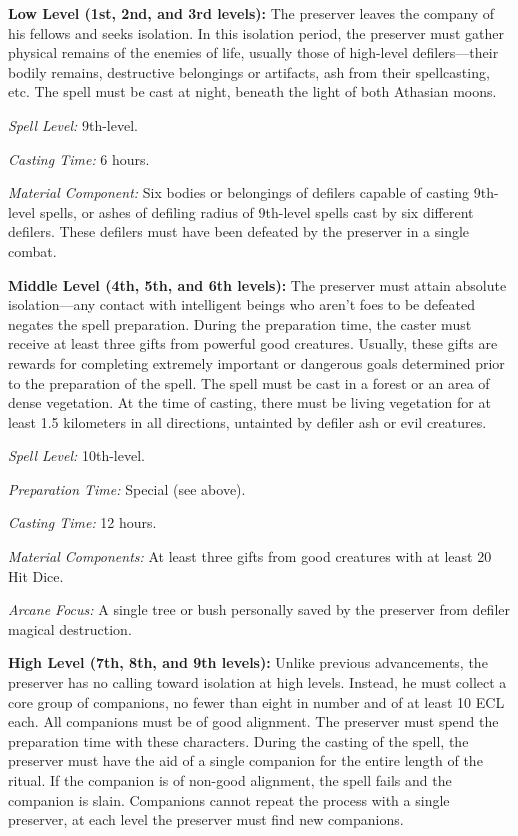 {\textbf{Low Level (1st, 2nd, and 3rd levels):} The preserver leaves the company of his fellows and seeks isolation. In this isolation period, the preserver must gather physical remains of the enemies of life, usually those of high-level defilers---their bodily remains, destructive belongings or artifacts, ash from their spellcasting, etc. The spell must be cast at night, beneath the light of both Athasian moons.

\textit{Spell Level:} 9th-level.

\textit{Casting Time:} 6 hours.

\textit{Material Component:} Six bodies or belongings of defilers capable of casting 9th-level spells, or ashes of defiling radius of 9th-level spells cast by six different defilers. These defilers must have been defeated by the preserver in a single combat.

\textbf{Middle Level (4th, 5th, and 6th levels):} The preserver must attain absolute isolation---any contact with intelligent beings who aren't foes to be defeated negates the spell preparation. During the preparation time, the caster must receive at least three gifts from powerful good creatures. Usually, these gifts are rewards for completing extremely important or dangerous goals determined prior to the preparation of the spell. The spell must be cast in a forest or an area of dense vegetation. At the time of casting, there must be living vegetation for at least 1.5 kilometers in all directions, untainted by defiler ash or evil creatures.

\textit{Spell Level:} 10th-level.

\textit{Preparation Time:} Special (see above).

\textit{Casting Time:} 12 hours.

\textit{Material Components:} At least three gifts from good creatures with at least 20 Hit Dice.

\textit{Arcane Focus:} A single tree or bush personally saved by the preserver from defiler magical destruction.

\textbf{High Level (7th, 8th, and 9th levels):} Unlike previous advancements, the preserver has no calling toward isolation at high levels. Instead, he must collect a core group of companions, no fewer than eight in number and of at least 10 ECL each. All companions must be of good alignment. The preserver must spend the preparation time with these characters. During the casting of the spell, the preserver must have the aid of a single companion for the entire length of the ritual. If the companion is of non-good alignment, the spell fails and the companion is slain. Companions cannot repeat the process with a single preserver, at each level the preserver must find new companions.

}
